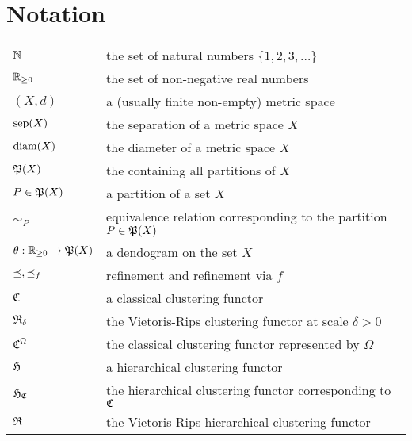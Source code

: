 \chapter{Notation}
\begin{tabular}{ll}
$\N$ & the set of natural numbers $\{1, 2, 3, \dots \}$\\
$\R_{\geq0}$ & the set of non-negative real numbers\\

$(X,d)$ & a (usually finite non-empty) metric space\\
$\sep(X)$ & the separation of a metric space $X$\\
$\diam(X)$ & the diameter of a metric space $X$\\

$\P(X)$ & the containing all partitions of $X$\\
$P \in \P(X)$ & a partition of a set $X$\\
$\sim_P$ & equivalence relation corresponding to the partition $P \in \P(X)$\\

$\theta: \R_{\geq0} \to \P(X)$ & a dendogram on the set $X$\\

$\refines, \refines_f$ & refinement and refinement via $f$\\

$\Cf$ & a classical clustering functor\\
$\Rf_\delta$ & the Vietoris-Rips clustering functor at scale $\delta>0$\\
$\Cf^\Omega$ & the classical clustering functor represented by $\Omega$\\

$\Hf$ & a hierarchical clustering functor\\
$\Hf_\Cf$ & the hierarchical clustering functor corresponding to $\Cf$\\
$\Rf$ & the Vietoris-Rips hierarchical clustering functor\\
\end{tabular}